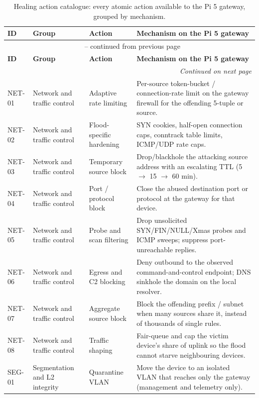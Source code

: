 \begin{longtable}{|p{}|p{}|p{}|p{}|}
\caption{Healing action catalogue: every atomic action available to the Pi 5 gateway, grouped by mechanism.}
\label{tab:healing_catalogue}\\
\hline
\textbf{ID} & \textbf{Group} & \textbf{Action} & \textbf{Mechanism on the Pi 5 gateway} \\
\hline
\endfirsthead
\multicolumn{4}{c}{\tablename\ \thetable{} -- continued from previous page}\\
\hline
\textbf{ID} & \textbf{Group} & \textbf{Action} & \textbf{Mechanism on the Pi 5 gateway} \\
\hline
\endhead
\hline \multicolumn{4}{r}{\textit{Continued on next page}}\\
\endfoot
\hline
\endlastfoot
NET-01 & Network and traffic control & Adaptive rate limiting & Per-source token-bucket / connection-rate limit on the gateway firewall for the offending 5-tuple or source. \\
\hline
NET-02 & Network and traffic control & Flood-specific hardening & SYN cookies, half-open connection caps, conntrack table limits, ICMP/UDP rate caps. \\
\hline
NET-03 & Network and traffic control & Temporary source block & Drop/blackhole the attacking source address with an escalating TTL (5 $\rightarrow$ 15 $\rightarrow$ 60 min). \\
\hline
NET-04 & Network and traffic control & Port / protocol block & Close the abused destination port or protocol at the gateway for that device. \\
\hline
NET-05 & Network and traffic control & Probe and scan filtering & Drop unsolicited SYN/FIN/NULL/Xmas probes and ICMP sweeps; suppress port-unreachable replies. \\
\hline
NET-06 & Network and traffic control & Egress and C2 blocking & Deny outbound to the observed command-and-control endpoint; DNS sinkhole the domain on the local resolver. \\
\hline
NET-07 & Network and traffic control & Aggregate source block & Block the offending prefix / subnet when many sources share it, instead of thousands of single rules. \\
\hline
NET-08 & Network and traffic control & Traffic shaping & Fair-queue and cap the victim device's share of uplink so the flood cannot starve neighbouring devices. \\
\hline
SEG-01 & Segmentation and L2 integrity & Quarantine VLAN & Move the device to an isolated VLAN that reaches only the gateway (management and telemetry only). \\

\end{longtable}
